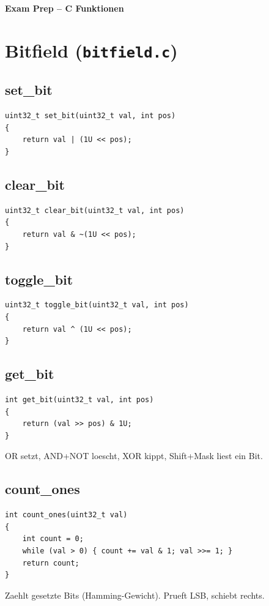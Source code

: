 \documentclass[10pt, a4paper]{article}
\begin{document}
\begin{center}
    {\large\bfseries Exam Prep -- C Funktionen}
\end{center}

\tableofcontents
\newpage

\section{Bitfield (\texttt{bitfield.c})}

\subsection{set\_bit}
\begin{lstlisting}
uint32_t set_bit(uint32_t val, int pos)
{
    return val | (1U << pos);
}    
\end{lstlisting}

\subsection{clear\_bit}
\begin{lstlisting}
uint32_t clear_bit(uint32_t val, int pos)
{ 
    return val & ~(1U << pos);
}  
\end{lstlisting}

\subsection{toggle\_bit}
\begin{lstlisting}
uint32_t toggle_bit(uint32_t val, int pos)
{
    return val ^ (1U << pos);
}  
\end{lstlisting}

\subsection{get\_bit}
\begin{lstlisting}
int get_bit(uint32_t val, int pos)    
{
    return (val >> pos) & 1U; 
}  
\end{lstlisting}

OR setzt, AND+NOT loescht, XOR kippt, Shift+Mask liest ein Bit.

\subsection{count\_ones}
\begin{lstlisting}
int count_ones(uint32_t val)
{
    int count = 0;
    while (val > 0) { count += val & 1; val >>= 1; }
    return count;
}
\end{lstlisting}
Zaehlt gesetzte Bits (Hamming-Gewicht). Prueft LSB, schiebt rechts.
\end{document}
